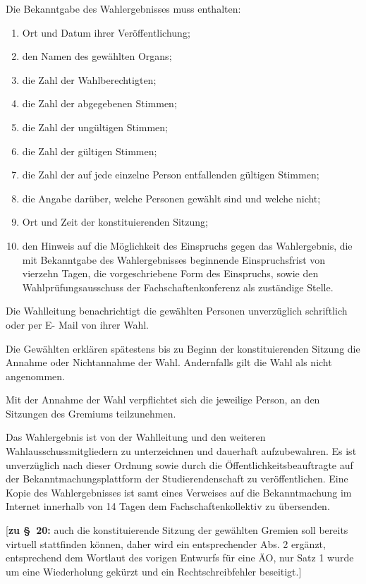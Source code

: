\documentclass[%
draft,%
multilinesections%
]{fswo}
\newcommand\bemFr[1] {{\color{Red}[#1]}}
\newcommand\bemFr[1]{}%
\begin{document}
\begin{contract}
Die Bekanntgabe des Wahlergebnisses muss enthalten:
\begin{enumerate}
\item Ort und Datum ihrer Veröffentlichung;
\item den Namen des gewählten Organs;
\item die Zahl der Wahlberechtigten;
\item die Zahl der abgegebenen Stimmen;
\item die Zahl der ungültigen Stimmen;
\item die Zahl der gültigen Stimmen;
\item die Zahl der auf jede einzelne Person entfallenden gültigen Stimmen;
\item die Angabe darüber, welche Personen gewählt sind und welche nicht;
\item Ort und Zeit der konstituierenden Sitzung;
\item den Hinweis auf die Möglichkeit des Einspruchs gegen das Wahlergebnis, die mit Bekanntgabe des Wahlergebnisses beginnende Einspruchsfrist von vierzehn Tagen, die vorgeschriebene Form des Einspruchs, sowie den Wahlprüfungsausschuss der Fachschaftenkonferenz als zuständige Stelle.
\end{enumerate}

Die Wahlleitung benachrichtigt die gewählten Personen unverzüglich schriftlich oder per E- Mail von ihrer Wahl.

Die Gewählten erklären spätestens bis zu Beginn der konstituierenden Sitzung die Annahme oder Nichtannahme der Wahl. Andernfalls gilt die Wahl als nicht angenommen.

Mit der Annahme der Wahl verpflichtet sich die jeweilige Person, an den Sitzungen des Gremiums teilzunehmen.

Das Wahlergebnis ist von der Wahlleitung und den weiteren Wahlausschussmitgliedern zu unterzeichnen und dauerhaft aufzubewahren.
Es ist unverzüglich nach  dieser Ordnung sowie durch die Öffentlichkeitsbeauftragte auf der Bekanntmachungsplattform der Studierendenschaft zu veröffentlichen.
Eine Kopie des Wahlergebnisses ist samt eines Verweises auf die Bekanntmachung im Internet innerhalb von 14 Tagen dem Fachschaftenkollektiv zu übersenden.
\end{contract}

\bemFr{\textbf{zu \S~20:}
auch die konstituierende Sitzung der gewählten Gremien soll bereits virtuell stattfinden können, daher wird ein entsprechender Abs. 2 ergänzt, entsprechend dem Wortlaut des vorigen Entwurfs für eine ÄO, nur Satz 1 wurde um eine Wiederholung gekürzt und ein Rechtschreibfehler beseitigt.}
\end{document}
